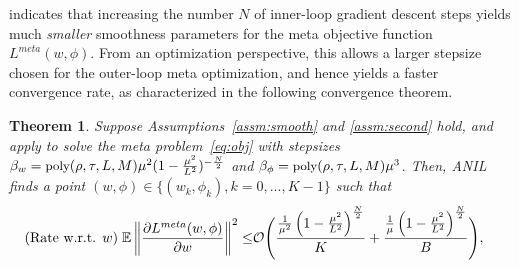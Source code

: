 \documentclass{osudissert96}
\newtheorem{theorem}{Theorem}
\begin{document}
  indicates that increasing the number $N$ of inner-loop gradient descent steps yields much {\em smaller} smoothness parameters for the meta objective function $L^{meta}(w,\phi)$. From an optimization perspective, this allows a larger stepsize chosen for the outer-loop meta optimization, and hence yields a faster convergence rate, as characterized in the following convergence theorem.
\begin{theorem}\label{th:strong-convex} %
Suppose Assumptions~\ref{assm:smooth} and \ref{assm:second} hold, and apply  to solve the meta  problem~\cref{eq:obj} with stepsizes $\beta_w={\small\text{\normalfont poly}(\rho,\tau,L,M) \mu^2(1-\frac{\mu^2}{L^2})^{-\frac{N}{2}}}$ and $\beta_\phi={\small\text{\normalfont poly}(\rho,\tau,L,M)\mu^{3}}$. %
Then, ANIL  finds a point $(w,\phi)\in\big\{(w_k,\phi_k),k=0,...,K-1\big\}$ such that 
\begin{align*}
\text{\normalfont (Rate w.r.t. $w$)}\;\mathbb{E}\left\| \frac{\partial L^{meta}(w,\phi)}{\partial w}\right\|^2  \leq& \mathcal{O}\Bigg( \frac{  \frac{1}{\mu^2}\left(1-\frac{\mu^2}{L^2}\right)^{\frac{N}{2}}}{K}      +\frac{\frac{1}{\mu} \left(1-\frac{\mu^2}{L^2}\right)^{\frac{N}{2}}}{B}     \Bigg), \nonumber

\end{align*}
\end{theorem}
\end{document}
